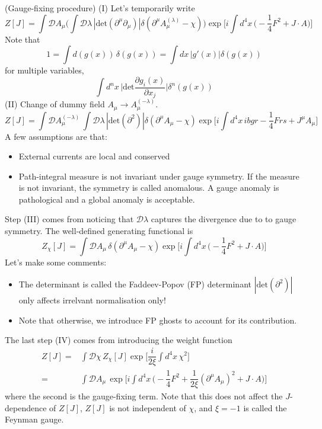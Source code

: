 \begin{prop}
(Gauge-fixing procedure) (I) Let's temporarily write
\[Z[J]=\int \mathcal{D}A_{\mu }\Big(\int \mathcal{D}\lambda \,|\mathrm{det}(\partial ^{\mu }\partial _{\mu })|\delta (\partial ^{\mu }A_{\mu }^{(\lambda )}-\chi )\Big)\exp \Big[i\int d^{4}x\,\Big(-\dfrac{1}{4}F^2+J\cdot A\Big)\Big]\]
Note that
\[1=\int d(g(x))\,\delta (g(x))=\int dx\,|g'(x)|\delta (g(x))\]
for multiple variables,
\[\int d^{n}x\,\Big|\mathrm{det}\dfrac{\partial g_{i}(x)}{\partial x_{j}} \Big|\delta ^{n}(g(x))\]
(II) Change of dummy field $A_{\mu }\rightarrow A_{\mu }^{(-\lambda )}$.
\[Z[J] =\int \mathcal{D}A_{\mu }^{(-\lambda )}\,\int \mathcal{D}\lambda \,|\mathrm{det}(\partial ^2)|\delta (\partial ^{\mu }A_{\mu }-\chi )\exp \Big[i\int d^{4}x\,ibgr-\dfrac{1}{4}Frs+J^{\mu }A_{\mu }\Big]\]
A few assumptions are that:
\begin{itemize}
\item[(i)] External currents are local and conserved
\item[(ii)] Path-integral measure is not invariant under gauge symmetry. If the measure is not invariant, the symmetry is called anomalous. A gauge anomaly is pathological and a global anomaly is acceptable. 
\end{itemize}
Step (III) comes from noticing that $\mathcal{D}\lambda $ captures the divergence due to to gauge symmetry. The well-defined generating functional is
\[Z_{\chi }[J]=\int \mathcal{D}A_{\mu }\,\delta (\partial ^{\mu }A_{\mu }-\chi )\exp \Big[i\int d^{4}x\,\Big(-\dfrac{1}{4}F^2+J\cdot A\Big)\Big]\]
Let's make some comments:
\begin{itemize}
\item[(i)] The determinant is called the Faddeev-Popov (FP) determinant $|\mathrm{det}(\partial ^2)|$ only affects irrelvant normalisation only! 
\item[(ii)] Note that otherwise, we introduce FP ghosts to account for its contribution.
\end{itemize}
The last step (IV) comes from introducing the weight function
\[\begin{align*}
Z[J]=&\int \mathcal{D}\chi \,Z_{\chi }[J]\exp \Big[\dfrac{i}{2\xi }\int d^{4}x\,\chi ^2\Big]\\
=&\int \mathcal{D}A_{\mu }\,\exp \Big[i\int d^{4}x\,\Big(-\dfrac{1}{4}F^2+\dfrac{1}{2\xi }(\partial ^{\mu }A_{\mu })^2+J\cdot A\Big)\Big]
\end{align*}\]
where the second is the gauge-fixing term. Note that this does not affect the $J$-dependence of $Z[J]$, $Z[J]$ is not independent of $\chi $, and $\xi=-1$ is called the Feynman gauge.
\end{prop}
